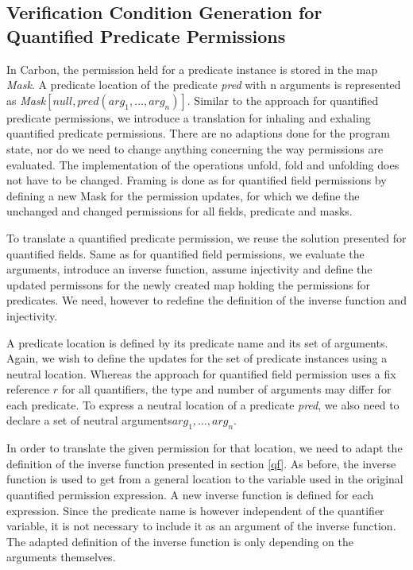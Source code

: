 \documentclass[12pt]{article}
\begin{document}
\subsection{Verification Condition Generation for Quantified Predicate Permissions}
\label{vcgPredicate}
In Carbon, the permission held for a predicate instance is stored in the map \textit{Mask}. A predicate location of the predicate \textit{pred} with n arguments is represented as \textit{Mask}\([null, pred(arg_1, \dots, arg_n)]\). Similar to the approach for quantified predicate permissions, we introduce a translation for inhaling and exhaling quantified predicate permissions. There are no adaptions done for the program state, nor do we need to change anything concerning the way permissions are evaluated. The implementation of the operations unfold, fold and unfolding does not have to be changed. Framing is done as for quantified field permissions by defining a new Mask for the permission updates, for which we define the unchanged and changed permissions for all fields, predicate and masks.

To translate a quantified predicate permission, we reuse the solution presented for quantified fields. Same as for quantified field permissions, we evaluate the arguments, introduce an inverse function, assume injectivity and define the updated permissons for the newly created map holding the permissions for predicates. We need, however to redefine the definition of the inverse function and injectivity.

A predicate location is defined by its predicate name and its set of arguments. Again, we wish to define the updates for the set of predicate instances using a neutral location. Whereas the approach for quantified field permission uses a fix reference \(r\) for all quantifiers, the type and number of arguments may differ for each predicate. To express a neutral location of a predicate \textit{pred}, we also need to declare a set of neutral arguments\(arg_1, \dots, arg_n\). 

In order to translate the given permission for that location, we need to adapt the definition of the inverse function presented in section \ref{qf}. As before, the inverse function is used to get from a general location to the variable used in the original quantified permission expression. A new inverse function is defined for each expression. Since the predicate name is however independent of the quantifier variable, it is not necessary to include it as an argument of the inverse function. The adapted definition of the inverse function is only depending on the arguments themselves.
\end{document}
